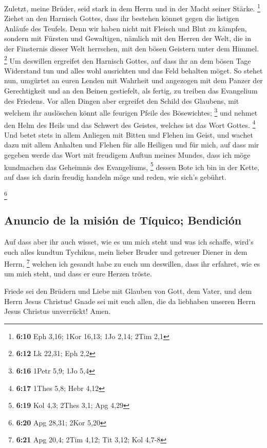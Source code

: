  Zuletzt, meine Brüder, seid stark in dem Herrn und in
der Macht seiner Stärke. \footnote{\textbf{6:10} Eph 3,16; 1Kor 16,13;
  1Jo 2,14; 2Tim 2,1}  Ziehet an den Harnisch Gottes,
dass ihr bestehen könnet gegen die listigen Anläufe des Teufels.
 Denn wir haben nicht mit Fleisch und Blut zu kämpfen,
sondern mit Fürsten und Gewaltigen, nämlich mit den Herren der Welt, die
in der Finsternis dieser Welt herrschen, mit den bösen Geistern unter
dem Himmel. \footnote{\textbf{6:12} Lk 22,31; Eph 2,2} 
Um deswillen ergreifet den Harnisch Gottes, auf dass ihr an dem bösen
Tage Widerstand tun und alles wohl ausrichten und das Feld behalten
möget.  So stehet nun, umgürtet an euren Lenden mit
Wahrheit und angezogen mit dem Panzer der Gerechtigkeit 
und an den Beinen gestiefelt, als fertig, zu treiben das Evangelium des
Friedens.  Vor allen Dingen aber ergreifet den Schild des
Glaubens, mit welchem ihr auslöschen könnt alle feurigen Pfeile des
Bösewichtes; \footnote{\textbf{6:16} 1Petr 5,9; 1Jo 5,4} 
und nehmet den Helm des Heils und das Schwert des Geistes, welches ist
das Wort Gottes. \footnote{\textbf{6:17} 1Thes 5,8; Hebr 4,12}
 Und betet stets in allem Anliegen mit Bitten und Flehen
im Geist, und wachet dazu mit allem Anhalten und Flehen für alle
Heiligen  und für mich, auf dass mir gegeben werde das
Wort mit freudigem Auftun meines Mundes, dass ich möge kundmachen das
Geheimnis des Evangeliums, \footnote{\textbf{6:19} Kol 4,3; 2Thes 3,1;
  Apg 4,29}  dessen Bote ich bin in der Kette, auf dass
ich darin freudig handeln möge und reden, wie sich's gebührt.

\footnote{\textbf{6:20} Apg 28,31; 2Kor 5,20}

\hypertarget{anuncio-de-la-misiuxf3n-de-tuxedquico-bendiciuxf3n}{%
\subsection{Anuncio de la misión de Tíquico;
Bendición}\label{anuncio-de-la-misiuxf3n-de-tuxedquico-bendiciuxf3n}}

 Auf dass aber ihr auch wisset, wie es um mich steht und
was ich schaffe, wird's euch alles kundtun Tychikus, mein lieber Bruder
und getreuer Diener in dem Herrn, \footnote{\textbf{6:21} Apg 20,4; 2Tim
  4,12; Tit 3,12; Kol 4,7-8}  welchen ich gesandt habe zu
euch um deswillen, dass ihr erfahret, wie es um mich steht, und dass er
eure Herzen tröste.

 Friede sei den Brüdern und Liebe mit Glauben von Gott,
dem Vater, und dem Herrn Jesus Christus!  Gnade sei mit
euch allen, die da liebhaben unseren Herrn Jesus Christus unverrückt!
Amen.
